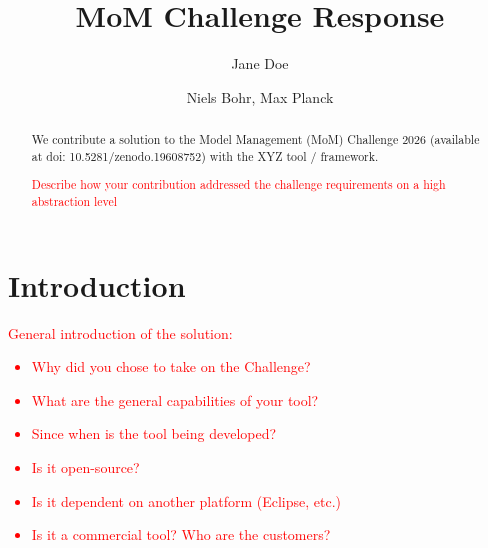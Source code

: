 \documentclass[sigconf,review]{acmart}
\begin{document}
\title{MoM Challenge Response}

\author{Jane Doe}

\author{Niels Bohr, Max Planck}



\renewcommand{\shortauthors}{Doe, J. \emph{et al.}}

\begin{abstract}
We contribute a solution to the Model Management (MoM) Challenge 2026 
(available at doi: 10.5281/zenodo.19608752) with the XYZ tool / framework. 

\textcolor{red}{Describe how your contribution addressed the challenge 
requirements on a high abstraction level}

\end{abstract}

\maketitle

\section{Introduction}
\label{sec:Introduction}
\textcolor{red}{
General introduction of the solution:
\begin{itemize}
    \item Why did you chose to take on the Challenge?
    \item What are the general capabilities of your tool?
    \item Since when is the tool being developed?
    \item Is it open-source? 
    \item Is it dependent on another platform (Eclipse, etc.)
    \item Is it a commercial tool? Who are the customers?
\end{itemize}
}
\end{document}
